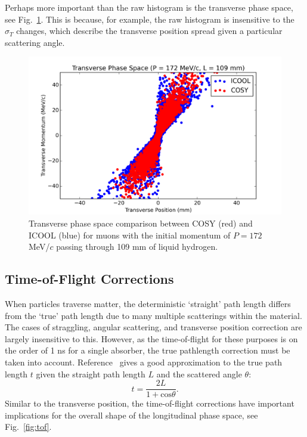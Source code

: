 \documentclass[a4paper,11pt]{article}
\begin{document}
Perhaps more important than the raw histogram is the transverse phase space, see Fig.~\ref{fig:transverse_phase_space}. This is because, for example, the raw histogram is insensitive to the $\sigma_T$ changes, which describe the transverse position spread given a particular scattering angle.

\begin{figure}[htb]
\centering
\includegraphics[width=\columnwidth]{transverse_phase_space}
\caption{Transverse phase space comparison between COSY (red) and ICOOL (blue) for muons with the initial momentum of $P=172$ MeV/$c$ passing through 109 mm of liquid hydrogen.}
\label{fig:transverse_phase_space}
\end{figure}

\subsection{Time-of-Flight Corrections}
When particles traverse matter, the deterministic `straight' path length differs from the `true' path length due to many multiple scatterings within the material. The cases of straggling, angular scattering, and transverse position correction are largely insensitive to this. However, as the time-of-flight for these purposes is on the order of 1 ns for a single absorber, the true pathlength correction must be taken into account. Reference~\cite{Bielajew} gives a good approximation to the true path length $t$ given the straight path length $L$ and the scattered angle $\theta$:
\[
t = \frac{2L}{1+\text{cos}\theta}.
\]
Similar to the transverse position, the time-of-flight corrections have important implications for the overall shape of the longitudinal phase space, see Fig.~\ref{fig:tof}.
\end{document}

